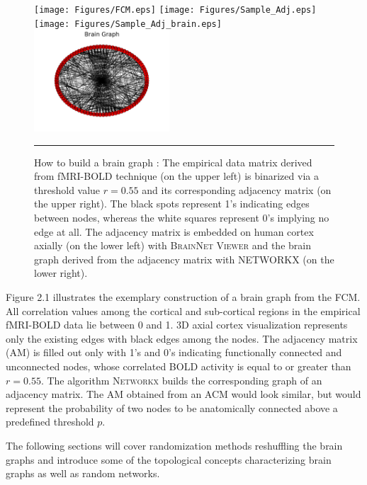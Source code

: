 \begin{figure}[htbp]
  \centering
	 \texttt{[image: Figures/FCM.eps]} 
	 \texttt{[image: Figures/Sample\_Adj.eps]} 
	\texttt{[image: Figures/Sample\_Adj\_brain.eps]}  
   \includegraphics[width=0.45\textwidth]{Figures/brain_graph.png}      

    \rule{35em}{0.5pt}
  \caption[Binarizing via thresholding]{How to build a brain graph : The empirical data matrix derived from fMRI-BOLD technique (on the upper left) is binarized via a threshold value $r=0.55$ and its corresponding adjacency matrix (on the upper right). The black spots represent 1's indicating edges between nodes, whereas the white squares represent 0's implying no edge at all. The adjacency matrix is embedded on human cortex axially (on the lower left) with \textsc{BrainNet Viewer} \citep{XYZ13} and the brain graph derived from the adjacency matrix with \textsc{NETWORKX} (on the lower right).}
  \label{fig:Binarizing via thresholding}
\end{figure}

Figure 2.1 illustrates the exemplary construction of a brain graph from the FCM. All correlation values among the cortical and sub-cortical regions in the empirical fMRI-BOLD data lie between 0 and 1. 3D axial cortex visualization represents only the existing edges with black edges among the nodes. The adjacency matrix (AM) is filled out only with 1's and 0's indicating functionally connected and unconnected nodes, whose correlated BOLD activity is equal to or greater than $r=0.55$. The algorithm \textsc{Networkx} builds the corresponding graph of an adjacency matrix. The AM obtained from an ACM would look similar, but would represent the probability of two nodes to be anatomically connected above a predefined threshold $p$. 

The following sections will cover randomization methods reshuffling the brain graphs and introduce some of the topological concepts characterizing brain graphs as well as random networks.



